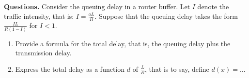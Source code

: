 \textbf{Questions.} Consider the queuing delay in a router buffer. Let
\(I\) denote the traffic intensity, that is: \(I =
\frac{aL}{R}\). Suppose that the queuing delay takes the form
\(\frac{IL}{R(1-I)}\) for \(I < 1\).
\begin{enumerate}

  \item Provide a formula for the total delay, that is, the queuing
    delay plus the transmission delay.

  \item Express the total delay as a function \(d\) of
    \(\frac{L}{R}\), that is to say, define \(d(x) = \ldots\)

\end{enumerate}
